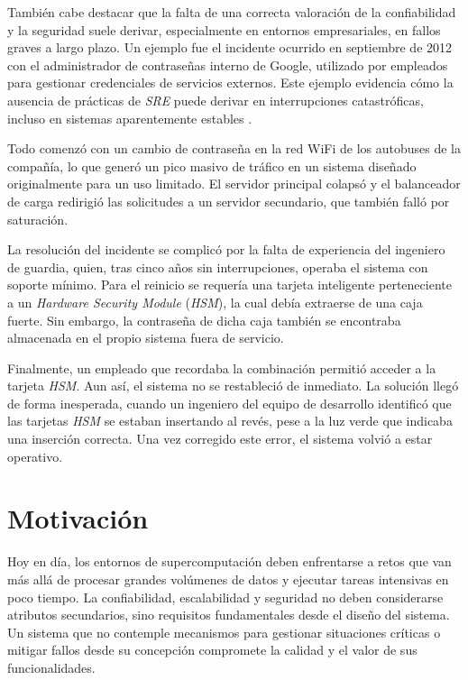 También cabe destacar que la falta de una correcta valoración de la confiabilidad y la seguridad suele derivar, especialmente en entornos empresariales, en fallos graves a largo plazo. Un ejemplo fue el incidente ocurrido en septiembre de 2012 con el administrador de contraseñas interno de Google, utilizado por empleados para gestionar credenciales de servicios externos. Este ejemplo evidencia cómo la ausencia de prácticas de \textit{SRE} puede derivar en interrupciones catastróficas, incluso en sistemas aparentemente estables \cite{ref6}.

Todo comenzó con un cambio de contraseña en la red WiFi de los autobuses de la compañía, lo que generó un pico masivo de tráfico en un sistema diseñado originalmente para un uso limitado. El servidor principal colapsó y el balanceador de carga redirigió las solicitudes a un servidor secundario, que también falló por saturación.

La resolución del incidente se complicó por la falta de experiencia del ingeniero de guardia, quien, tras cinco años sin interrupciones, operaba el sistema con soporte mínimo. Para el reinicio se requería una tarjeta inteligente perteneciente a un \textit{Hardware Security Module} (\textit{HSM}), la cual debía extraerse de una caja fuerte. Sin embargo, la contraseña de dicha caja también se encontraba almacenada en el propio sistema fuera de servicio.

Finalmente, un empleado que recordaba la combinación permitió acceder a la tarjeta \textit{HSM}. Aun así, el sistema no se restableció de inmediato. La solución llegó de forma inesperada, cuando un ingeniero del equipo de desarrollo identificó que las tarjetas \textit{HSM} se estaban insertando al revés, pese a la luz verde que indicaba una inserción correcta. Una vez corregido este error, el sistema volvió a estar operativo.

\section{Motivación}

Hoy en día, los entornos de supercomputación deben enfrentarse a retos que van más allá de procesar grandes volúmenes de datos y ejecutar tareas intensivas en poco tiempo. La confiabilidad, escalabilidad y seguridad no deben considerarse atributos secundarios, sino requisitos fundamentales desde el diseño del sistema. Un sistema que no contemple mecanismos para gestionar situaciones críticas o mitigar fallos desde su concepción compromete la calidad y el valor de sus funcionalidades.

